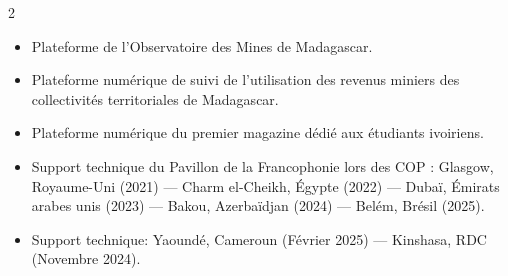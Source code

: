 \documentclass[10pt,a4paper,ragged2e,withhyper]{altacv}
\begin{document}
\begin{paracol}{2}
            \begin{itemize}
                \item Plateforme de l'Observatoire des Mines de Madagascar.
            \end{itemize}
            \divider

            \newpage

            \begin{itemize}
                \item Plateforme numérique de suivi de l'utilisation des revenus miniers des collectivités territoriales de Madagascar.
            \end{itemize}
            \divider

            \begin{itemize}
                \item Plateforme numérique du premier magazine dédié aux étudiants ivoiriens.
            \end{itemize}


            \begin{itemize}
                \item Support technique du Pavillon de la Francophonie lors des COP : Glasgow, Royaume-Uni (2021) — Charm el-Cheikh, Égypte (2022) — Dubaï, Émirats arabes unis (2023) — Bakou, Azerbaïdjan (2024) — Belém, Brésil (2025).
            \end{itemize}
            \divider

            \begin{itemize}
                \item Support technique: Yaoundé, Cameroun (Février 2025) — Kinshasa, RDC (Novembre 2024).
            \end{itemize}
        

\end{paracol}
\end{document}
